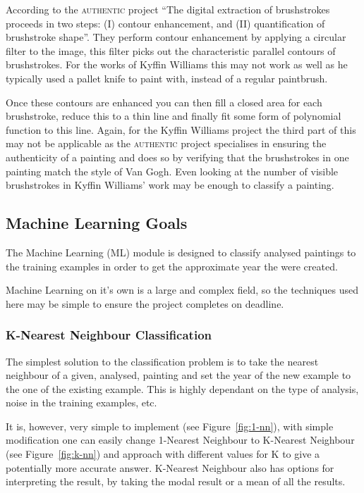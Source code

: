 \documentclass[11pt,fleqn,twoside]{article}
\begin{document}
According to the \textsc{authentic} project ``The digital extraction of brushstrokes proceeds in 
two steps: (I) contour enhancement, and (II) quantification of brushstroke 
shape''\cite{citeulike:11446581}. They perform contour enhancement by applying a circular filter to
the image, this filter picks out the characteristic parallel contours of brushstrokes. For the 
works of Kyffin Williams this may not work as well as he typically used a pallet knife %
to paint with, instead of a regular paintbrush.

Once these contours are enhanced you can then fill a closed area for each brushstroke, reduce this 
to a thin line and finally fit some form of polynomial function to this line. Again, for the Kyffin
Williams project the third part of this may not be applicable as the \textsc{authentic} project
specialises in ensuring the authenticity of a painting and does so by verifying that the 
brushstrokes in one painting match the style of Van Gogh. Even looking at the number of visible
brushstrokes in Kyffin Williams' work may be enough to classify a painting.

\subsection{Machine Learning Goals}
The Machine Learning (ML) module is designed to classify analysed paintings to the training 
examples in order to get the approximate year the were created.

Machine Learning on it's own is a large and complex field, so the techniques used here may be
simple to ensure the project completes on deadline.

\subsubsection{K-Nearest Neighbour Classification}
The simplest solution to the classification problem is to take the nearest neighbour of a given,
analysed, painting and set the year of the new example to the one of the existing example. This
is highly dependant on the type of analysis, noise in the training examples, etc.

It is, however, very simple to implement (see Figure~\ref{fig:1-nn}), with simple modification
one can easily change 1-Nearest Neighbour to K-Nearest Neighbour (see Figure~\ref{fig:k-nn}) and
approach with different values for K to give a potentially more accurate answer. K-Nearest 
Neighbour also has options for interpreting the result, by taking the modal result or a mean of all
the results.
\end{document}
